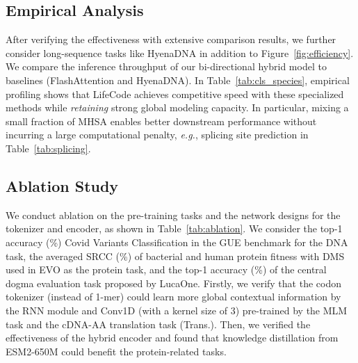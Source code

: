 \subsection{Empirical Analysis}
\label{sec:exp_empirical}
After verifying the effectiveness with extensive comparison results, we further consider long-sequence tasks like HyenaDNA \citep{nips2024hyenadna} in addition to Figure~\ref{fig:efficiency}.
% 
% 
We compare the inference throughput of our bi-directional hybrid model to baselines (FlashAttention and HyenaDNA). In Table~\ref{tab:cls_species}, empirical profiling shows that LifeCode achieves competitive speed with these specialized methods while \textit{retaining} strong global modeling capacity. In particular, mixing a small fraction of MHSA enables better downstream performance without incurring a large computational penalty, \textit{e.g.}, splicing site prediction in Table~\ref{tab:splicing}.




\subsection{Ablation Study}
We conduct ablation on the pre-training tasks and the network designs for the tokenizer and encoder, as shown in Table~\ref{tab:ablation}. We consider the top-1 accuracy (\%) Covid Variants Classification in the GUE benchmark for the DNA task, the averaged SRCC (\%) of bacterial and human protein fitness with DMS used in EVO as the protein task, and the top-1 accuracy (\%) of the central dogma evaluation task proposed by LucaOne. Firstly, we verify that the codon tokenizer (instead of 1-mer) could learn more global contextual information by the RNN module and Conv1D (with a kernel size of 3) pre-trained by the MLM task and the cDNA-AA translation task (Trans.). Then, we verified the effectiveness of the hybrid encoder and found that knowledge distillation from ESM2-650M could benefit the protein-related tasks.
